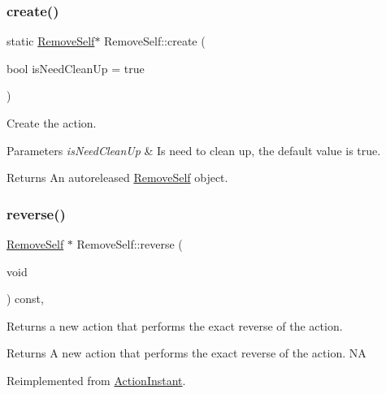 \subsubsection{\texorpdfstring{create()}{create()}\hspace{0.1cm}{\footnotesize\ttfamily [2/2]}}
{\footnotesize\ttfamily static \hyperlink{classRemoveSelf}{Remove\+Self}$\ast$ Remove\+Self\+::create (\begin{DoxyParamCaption}\item[{bool}]{is\+Need\+Clean\+Up = {\ttfamily true} }\end{DoxyParamCaption})\hspace{0.3cm}{\ttfamily [static]}}

Create the action.


\begin{DoxyParams}{Parameters}
{\em is\+Need\+Clean\+Up} & Is need to clean up, the default value is true. \\
\hline
\end{DoxyParams}
\begin{DoxyReturn}{Returns}
An autoreleased \hyperlink{classRemoveSelf}{Remove\+Self} object. 
\end{DoxyReturn}
\mbox{\label{classRemoveSelf_a687363c6f0d38c4be9b797b76a505648}} 
\subsubsection{\texorpdfstring{reverse()}{reverse()}\hspace{0.1cm}{\footnotesize\ttfamily [1/2]}}
{\footnotesize\ttfamily \hyperlink{classRemoveSelf}{Remove\+Self} $\ast$ Remove\+Self\+::reverse (\begin{DoxyParamCaption}\item[{void}]{ }\end{DoxyParamCaption}) const\hspace{0.3cm}{\ttfamily [override]}, {\ttfamily [virtual]}}

Returns a new action that performs the exact reverse of the action.

\begin{DoxyReturn}{Returns}
A new action that performs the exact reverse of the action.  NA 
\end{DoxyReturn}


Reimplemented from \hyperlink{classActionInstant_aeb1870802c509e1f4111c863a28e9262}{Action\+Instant}.

